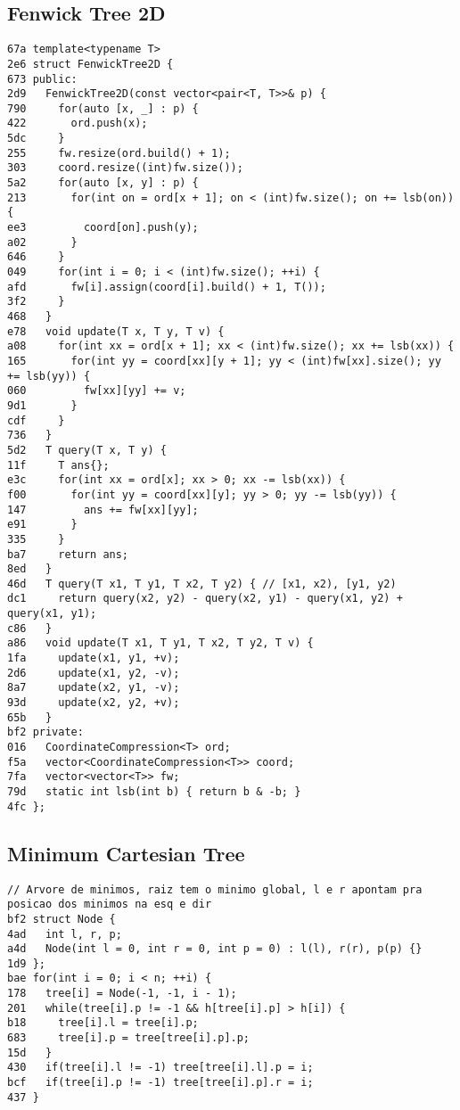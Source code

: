 \documentclass[10pt, a4paper, twoside]{article}
\begin{document}
\subsection{Fenwick Tree 2D}
\begin{lstlisting}
67a template<typename T>
2e6 struct FenwickTree2D {
673 public:
2d9   FenwickTree2D(const vector<pair<T, T>>& p) {
790     for(auto [x, _] : p) {
422       ord.push(x);
5dc     }
255     fw.resize(ord.build() + 1);
303     coord.resize((int)fw.size());
5a2     for(auto [x, y] : p) {
213       for(int on = ord[x + 1]; on < (int)fw.size(); on += lsb(on)) {
ee3         coord[on].push(y);
a02       }
646     }
049     for(int i = 0; i < (int)fw.size(); ++i) {
afd       fw[i].assign(coord[i].build() + 1, T());
3f2     }
468   }
e78   void update(T x, T y, T v) {
a08     for(int xx = ord[x + 1]; xx < (int)fw.size(); xx += lsb(xx)) {
165       for(int yy = coord[xx][y + 1]; yy < (int)fw[xx].size(); yy += lsb(yy)) {
060         fw[xx][yy] += v;
9d1       }
cdf     }
736   }
5d2   T query(T x, T y) {
11f     T ans{};
e3c     for(int xx = ord[x]; xx > 0; xx -= lsb(xx)) {
f00       for(int yy = coord[xx][y]; yy > 0; yy -= lsb(yy)) {
147         ans += fw[xx][yy];
e91       }
335     }
ba7     return ans;
8ed   }
46d   T query(T x1, T y1, T x2, T y2) { // [x1, x2), [y1, y2)
dc1     return query(x2, y2) - query(x2, y1) - query(x1, y2) + query(x1, y1);
c86   }
a86   void update(T x1, T y1, T x2, T y2, T v) {
1fa     update(x1, y1, +v);
2d6     update(x1, y2, -v);
8a7     update(x2, y1, -v);
93d     update(x2, y2, +v);
65b   }
bf2 private:
016   CoordinateCompression<T> ord;
f5a   vector<CoordinateCompression<T>> coord;
7fa   vector<vector<T>> fw;
79d   static int lsb(int b) { return b & -b; }
4fc };
\end{lstlisting}

\subsection{Minimum Cartesian Tree}
\begin{lstlisting}
// Arvore de minimos, raiz tem o minimo global, l e r apontam pra posicao dos minimos na esq e dir
bf2 struct Node {
4ad   int l, r, p;
a4d   Node(int l = 0, int r = 0, int p = 0) : l(l), r(r), p(p) {}
1d9 };
bae for(int i = 0; i < n; ++i) {
178   tree[i] = Node(-1, -1, i - 1);
201   while(tree[i].p != -1 && h[tree[i].p] > h[i]) {
b18     tree[i].l = tree[i].p;
683     tree[i].p = tree[tree[i].p].p;
15d   }
430   if(tree[i].l != -1) tree[tree[i].l].p = i;
bcf   if(tree[i].p != -1) tree[tree[i].p].r = i;
437 }
\end{lstlisting}
\end{document}
